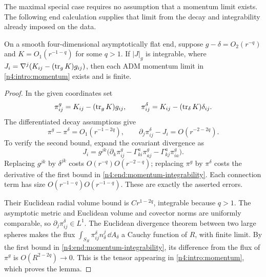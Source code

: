 The maximal special case requires no assumption that a momentum limit
exists. The following end calculation supplies that limit from the
decay and integrability already imposed on the data.

\begin{lemma}\label{n4:lem:momentum-exists}
On a smooth four-dimensional asymptotically flat end, suppose
$g-\delta=O_2(r^{-q})$ and $K=O_1(r^{-1-q})$ for some $q>1$.
If $|J|_g$ is integrable, where
$J_i=\nabla^j(K_{ij}-(\operatorname{tr}_gK)g_{ij})$, then each ADM momentum
limit in \eqref{n4:intro:momentum} exists and is finite.
\end{lemma}

\begin{proof}
In the given coordinates set
\[
 \pi^g_{ij}=K_{ij}-(\operatorname{tr}_gK)g_{ij},\qquad
 \pi^\delta_{ij}=K_{ij}-(\operatorname{tr}_\delta K)\delta_{ij}.
\]
The differentiated decay assumptions give
\begin{equation}\label{n4:end:momentum-integrability}
 \pi^g-\pi^\delta=O_1(r^{-1-2q}),\qquad
 \partial_j\pi^\delta_{ij}-J_i=O(r^{-2-2q}).
\end{equation}
To verify the second bound, expand the covariant divergence as
\[
 J_i=g^{jk}\bigl(\partial_k\pi^g_{ij}
       -\Gamma^a_{ki}\pi^g_{aj}-\Gamma^a_{kj}\pi^g_{ia}\bigr).
\]
Replacing $g^{jk}$ by $\delta^{jk}$ costs
$O(r^{-q})O(r^{-2-q})$; replacing $\pi^g$ by $\pi^\delta$
costs the derivative of the first bound in
\eqref{n4:end:momentum-integrability}. Each connection term has size
$O(r^{-1-q})O(r^{-1-q})$. These are exactly the asserted errors.

Their Euclidean radial volume bound is $Cr^{1-2q}$, integrable because
$q>1$. The asymptotic metric and Euclidean volume and covector norms
are uniformly comparable, so $\partial_j\pi^\delta_{ij}\in L^1$.
The Euclidean divergence theorem between two large spheres makes
the flux $\int_{S_R}\pi^\delta_{ij}n_\delta^j\,\dd A_\delta$
a Cauchy function of $R$, with finite limit. By the first bound in
\eqref{n4:end:momentum-integrability}, its difference from the flux
of $\pi^g$ is $O(R^{2-2q})\to0$. This is the tensor appearing
in \eqref{n4:intro:momentum}, which proves the lemma.
\end{proof}

